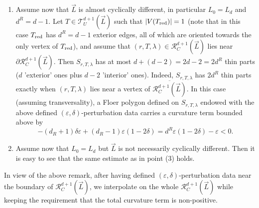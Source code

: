 \begin{rem}
\begin{enumerate}
			\item Assume now that $\vec{L}$ is almost cyclically different, in particular $L_0=L_d$ and $d^R= d-1$. Let $T\in \mathcal{T}_U^{d+1}(\vec{L})$ such that $|V(T_\textnormal{red})|=1$ (note that in this case $T_\textnormal{red}$ has $d^R=d-1$ exterior edges, all of which are oriented towards the only vertex of $T_\textnormal{red}$), and assume that $(r,T,\lambda)\in \mathcal{R}^{d+1}_C(\vec{L})$ lies near $\partial \mathcal{R}^{d+1}_C(\vec{L})$. Then $S_{r,T,\lambda}$ has at most $d+(d-2)=2d-2=2d^R$ thin parts ($d$ 'exterior' ones plus $d-2$ 'interior' ones). Indeed, $S_{r,T,\lambda}$ has $2d^R$ thin parts exactly when $(r,T,\lambda)$ lies near a vertex of $\overline{\mathcal{R}^{d+1}_C(\vec{L})}$. In this case (assuming transversality), a Floer polygon defined on $S_{r,T,\lambda}$ endowed with the above defined $(\varepsilon,\delta)$-perturbation data carries a curvature term bounded above by 
			$$-(d_R+1)\delta\varepsilon + (d_R-1)\varepsilon(1-2\delta) = d^R\varepsilon(1-2\delta)-\varepsilon<0.$$
			\item Assume now that $L_0=L_d$ but $\vec{L}$ is not necessarily cyclically different.  Then it is easy to see that the same estimate as in point (3) holds.
		\end{enumerate}
	\end{rem}
	
	\noindent In view of the above remark, after having defined $(\varepsilon,\delta)$-perturbation data near the boundary of $\mathcal{R}^{d+1}_C(\vec{L})$, we interpolate on the whole $\mathcal{R}^{d+1}_C(\vec{L})$ while keeping the requirement that the total curvature term is non-positive.\\
	
